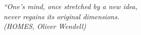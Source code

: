 \begin{epigrafe}
    \vspace*{\fill}
	\begin{flushright}
		\textit{``One’s mind, once stretched by a new idea, \\
		 never regains its original dimensions. \\
		(HOMES, Oliver Wendell)}
	\end{flushright}
\end{epigrafe}
